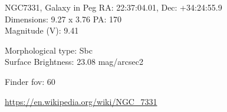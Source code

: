 \begin{block}{NGC7331, Galaxy in Peg}
    RA: 22:37:04.01, Dec: +34:24:55.9 \\ 
    Dimensions: 9.27 x 3.76 PA: 170 \\ 
    Magnitude (V): 9.41

    Morphological type: Sbc \\ 
    Surface Brightness: 23.08 mag/arcsec2 


    Finder fov: 60 

    \url{https://en.wikipedia.org/wiki/NGC_7331} 
\end{block}